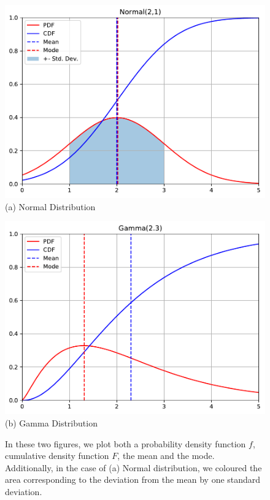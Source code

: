 \documentclass{report}
\begin{document}
\begin{figure}[t]
    \begin{minipage}{0.48\textwidth}
        \centering
        \includegraphics[width=\columnwidth]{figures/gauss.pdf}
        (a) Normal Distribution
    \end{minipage}
    \hfill
    \begin{minipage}{0.48\textwidth}
        \centering
        \includegraphics[width=\columnwidth]{figures/gamma.pdf}
        (b) Gamma Distribution
    \end{minipage}
    \caption{
        \label{fig:distributions}
        In these two figures, we plot both a probability density function $f$,
        cumulative density function $F$, the mean and the mode. Additionally, in
        the case of (a) Normal distribution, we coloured the area corresponding
        to the deviation from the mean by one standard deviation.
    }
\end{figure}
\end{document}
